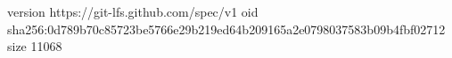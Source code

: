 version https://git-lfs.github.com/spec/v1
oid sha256:0d789b70c85723be5766e29b219ed64b209165a2e0798037583b09b4fbf02712
size 11068
